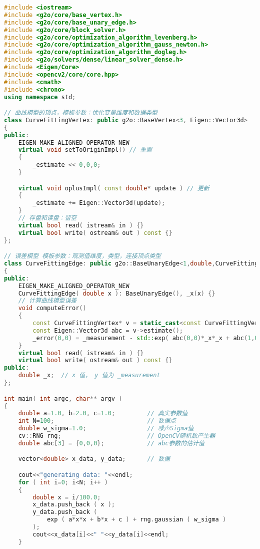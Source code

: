 \clearpage
\begin{lstlisting}[language=c++,caption=slambook/ch6/g2o\_curve\_fitting/main.cpp]
#include <iostream>
#include <g2o/core/base_vertex.h>
#include <g2o/core/base_unary_edge.h>
#include <g2o/core/block_solver.h>
#include <g2o/core/optimization_algorithm_levenberg.h>
#include <g2o/core/optimization_algorithm_gauss_newton.h>
#include <g2o/core/optimization_algorithm_dogleg.h>
#include <g2o/solvers/dense/linear_solver_dense.h>
#include <Eigen/Core>
#include <opencv2/core/core.hpp>
#include <cmath>
#include <chrono>
using namespace std; 

// 曲线模型的顶点，模板参数：优化变量维度和数据类型
class CurveFittingVertex: public g2o::BaseVertex<3, Eigen::Vector3d>
{
public:
	EIGEN_MAKE_ALIGNED_OPERATOR_NEW
	virtual void setToOriginImpl() // 重置
	{
		_estimate << 0,0,0;
	}

	virtual void oplusImpl( const double* update ) // 更新
	{
		_estimate += Eigen::Vector3d(update);
	}
	// 存盘和读盘：留空
	virtual bool read( istream& in ) {}
	virtual bool write( ostream& out ) const {}
};

// 误差模型 模板参数：观测值维度，类型，连接顶点类型
class CurveFittingEdge: public g2o::BaseUnaryEdge<1,double,CurveFittingVertex>
{
public:
	EIGEN_MAKE_ALIGNED_OPERATOR_NEW
	CurveFittingEdge( double x ): BaseUnaryEdge(), _x(x) {}
	// 计算曲线模型误差
	void computeError()
	{
		const CurveFittingVertex* v = static_cast<const CurveFittingVertex*> (_vertices[0]);
		const Eigen::Vector3d abc = v->estimate();
		_error(0,0) = _measurement - std::exp( abc(0,0)*_x*_x + abc(1,0)*_x + abc(2,0) ) ;
	}
	virtual bool read( istream& in ) {}
	virtual bool write( ostream& out ) const {}
public:
	double _x;  // x 值， y 值为 _measurement
};

int main( int argc, char** argv )
{
	double a=1.0, b=2.0, c=1.0;         // 真实参数值
	int N=100;                          // 数据点
	double w_sigma=1.0;                 // 噪声Sigma值
	cv::RNG rng;                        // OpenCV随机数产生器
	double abc[3] = {0,0,0};            // abc参数的估计值

	vector<double> x_data, y_data;      // 数据

	cout<<"generating data: "<<endl;
	for ( int i=0; i<N; i++ )
	{
		double x = i/100.0;
		x_data.push_back ( x );
		y_data.push_back (
			exp ( a*x*x + b*x + c ) + rng.gaussian ( w_sigma )
		);
		cout<<x_data[i]<<" "<<y_data[i]<<endl;
	}


\end{lstlisting}
